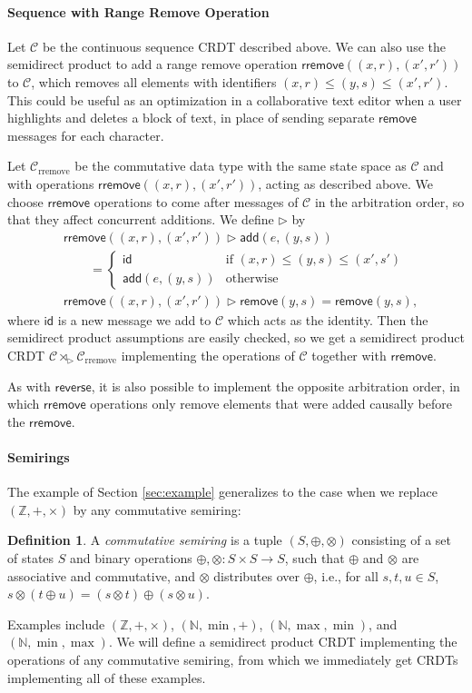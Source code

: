 \documentclass[acmsmall,nonacm,12pt]{acmart}
\newcommand{\mc}[1]{\ensuremath{\mathcal{#1}}}
\newcommand{\mb}[1]{\ensuremath{\mathbb{#1}}}
\newcommand{\msf}[1]{\ensuremath{\mathsf{#1}}}
\newcommand{\ra}{\rightarrow}
\newcommand{\act}{\triangleright}
\newcommand{\N}{\mb{N}}
\newcommand{\Z}{\mb{Z}}
\theoremstyle{plain}
\theoremstyle{definition}
\newtheorem{mydef}[mythm]{Definition}
\begin{document}
\paragraph{Sequence with Range Remove Operation}
Let $\mc{C}$ be the continuous sequence CRDT described above.  We can also use the semidirect product to add a range remove operation $\msf{rremove}((x, r), (x', r'))$ to $\mc{C}$, which removes all elements with identifiers $(x, r) \le (y, s) \le (x', r')$.  This could be useful as an optimization in a collaborative text editor when a user highlights and deletes a block of text, in place of sending separate $\msf{remove}$ messages for each character.

Let $\mc{C}_{\text{rremove}}$ be the commutative data type with the same state space as $\mc{C}$ and with operations $\msf{rremove}((x, r), (x', r'))$, acting as described above.  We choose $\msf{rremove}$ operations to come after messages of $\mc{C}$ in the arbitration order, so that they affect concurrent additions.  We define $\act$ by
\begin{align*}
&\msf{rremove}((x, r), (x', r')) \act \msf{add}(e, (y, s)) \\
&\qquad = \begin{cases} \msf{id} &\mbox{if $(x, r) \le (y, s) \le (x', s')$} \\ \msf{add}(e, (y, s)) &\mbox{otherwise} \end{cases}
\\
&\msf{rremove}((x, r), (x', r')) \act \msf{remove}(y, s) = \msf{remove}(y, s),
\end{align*}
where $\msf{id}$ is a new message we add to $\mc{C}$ which acts as the identity.  Then the semidirect product assumptions are easily checked, so we get a semidirect product CRDT $\mc{C} \rtimes_\act \mc{C}_{\text{rremove}}$ implementing the operations of $\mc{C}$ together with $\msf{rremove}$.

As with $\msf{reverse}$, it is also possible to implement the opposite arbitration order, in which $\msf{rremove}$ operations only remove elements that were added causally before the $\msf{rremove}$.



\paragraph{Semirings}
The example of Section \ref{sec:example} generalizes to the case when we replace $(\Z, +, \times)$ by any commutative semiring:
\begin{mydef}
A \textit{commutative semiring} \cite{semiring} is a tuple $(S, \oplus, \otimes)$ consisting of a set of states $S$ and binary operations $\oplus, \otimes: S \times S \ra S$, such that $\oplus$ and $\otimes$ are associative and commutative, and $\otimes$ distributes over $\oplus$, i.e., for all $s, t, u \in S$, $s \otimes (t \oplus u) = (s \otimes t) \oplus (s \otimes u)$.
\end{mydef}
Examples include $(\Z, +, \times)$, $(\N, \min, +)$, $(\N, \max, \min)$, and $(\N, \min, \max)$.  We will define a semidirect product CRDT implementing the operations of any commutative semiring, from which we immediately get CRDTs implementing all of these examples.
\end{document}
